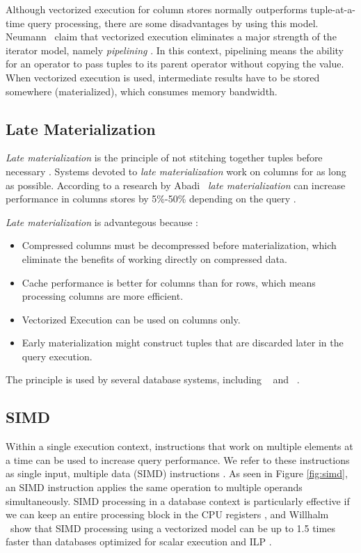 Although vectorized execution for column stores normally outperforms tuple-at-a-time query processing, there are some disadvantages by using this model. Neumann \ea~claim that vectorized execution eliminates a major strength of the iterator model, namely \textit{pipelining} \cite{Neumann2011-uq}. In this context, pipelining means the ability for an operator to pass tuples to its parent operator without copying the value. When vectorized execution is used, intermediate results have to be stored somewhere (materialized), which consumes memory bandwidth.

\subsection{Late Materialization}
\label{sub:Late Materialization}
\textit{Late materialization} is the principle of not stitching together tuples before necessary \cite{Abadi2008-dd}. Systems devoted to \textit{late materialization} work on columns for as long as possible. According to a research by Abadi \ea~\textit{late materialization} can increase performance in columns stores by 5\%-50\% depending on the query \cite{Abadi2008-dd}.

\textit{Late materialization} is advantegous because \cite{Abadi2008-dd}:
\begin{itemize}
  \item Compressed columns must be decompressed before materialization, which eliminate the benefits of working directly on compressed data. 
  \item Cache performance is better for columns than for rows, which means processing columns are more efficient. 
  \item Vectorized Execution can be used on columns only. 
  \item Early materialization might construct tuples that are discarded later in the query execution.
\end{itemize}

The  principle is used by several database systems, including \ibm~\cite{Raman2013-em} and \monetdb~\cite{Boncz2002-yj}. 
\subsection{SIMD}
\label{sub:SIMD}
Within a single execution context, instructions that work on multiple elements at a time can be used to increase query performance. We refer to these instructions as single input, multiple data (SIMD) instructions \cite{Wikipedia_contributors2015-ax}. As seen in Figure \ref{fig:simd}, an SIMD instruction applies the same operation to multiple operands simultaneously. SIMD processing in a database context is particularly effective if we can keep an entire processing block in the CPU registers \cite{Neumann2011-uq}, and Willhalm \ea~show that SIMD processing using a vectorized model can be up to 1.5 times faster than databases optimized for scalar execution and ILP \cite{Willhalm2009-hu}.

